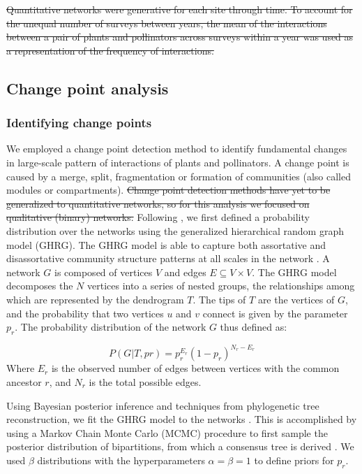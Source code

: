 \documentclass[12pt]{article}
\providecommand{\DIFaddtex}[1]{{\protect\color{blue}\uwave{#1}}} %
\providecommand{\DIFdeltex}[1]{{\protect\color{red}\sout{#1}}}                      %
\providecommand{\DIFaddbegin}{} %
\providecommand{\DIFaddend}{} %
\providecommand{\DIFdelbegin}{} %
\providecommand{\DIFdelend}{} %
\providecommand{\DIFadd}[1]{\texorpdfstring{\DIFaddtex{#1}}{#1}} %
\providecommand{\DIFdel}[1]{\texorpdfstring{\DIFdeltex{#1}}{}} %
\begin{document}
\DIFdelbegin \DIFdel{Quantitative networks were generative for each site through time. To
account for the unequal number of surveys between years, the mean of
the interactions between a pair of plants and pollinators across
surveys within a year was used as a representation of the frequency of
interactions.
}%

\DIFdelend \subsection*{Change point analysis}
\subsubsection*{Identifying change points}
We employed a change point detection method \citep{peel2014detecting}
to identify fundamental changes in large-scale pattern of interactions
of plants and pollinators. A change point is caused by a merge, split,
fragmentation or formation of communities (also called modules or
compartments). \DIFdelbegin \DIFdel{Change point detection methods have yet to be
generalized to quantitative networks, so for this analysis we focused
on qualitative (binary) networks. }\DIFdelend Following \cite{peel2014detecting}, we first defined a
probability distribution over the networks using the generalized
hierarchical random graph model (GHRG). The GHRG model is able to
capture both assortative and disassortative community structure
patterns at all scales in the network \citep{peel2014detecting}. A
network $G$ is composed of vertices $V$ and edges $E \subseteq {V × V
}$. The GHRG model decomposes the $N$ vertices into a series of nested
groups, the relationships among which are represented by the
dendrogram $T$.  The tips of $T$ are the vertices of $G$, and the
probability that two vertices $u$ and $v$ connect is given by the
parameter $p_r$. The probability distribution of the network $G$ thus
defined as:

\begin{equation}
    \label{eq:lik}
    P(G|T,{pr}) = p_r^{E_r}(1-p_r)^{N_r-E_r}
\end{equation}
% 
Where $E_r$ is the observed number of edges between vertices with the
common ancestor $r$, and $N_r$ is the total possible edges. 

Using Bayesian posterior inference and techniques from phylogenetic
tree reconstruction, we fit the GHRG model to the networks
\citep{peel2014detecting}. This is accomplished by using a Markov
Chain Monte Carlo (MCMC) procedure to first sample the posterior
distribution of bipartitions, from which a consensus tree is derived
\citep{peel2014detecting}. \DIFaddbegin \DIFadd{ADD NEWMAN PAPER. }\DIFaddend We used $\beta$
distributions with the hyperparameters $\alpha=\beta=1$ to define
priors for $p_r$.
\end{document}
